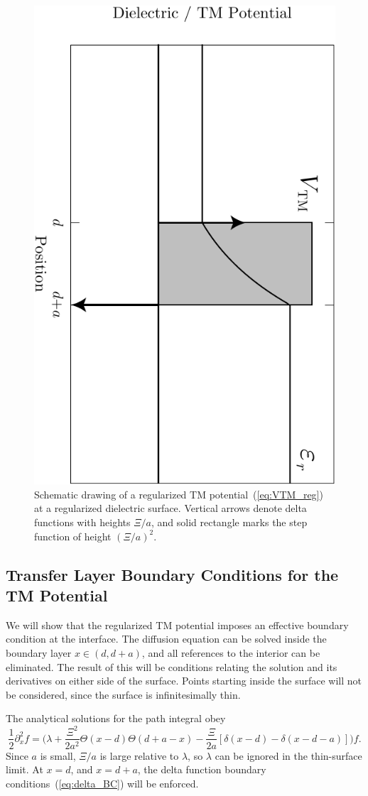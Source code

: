 \begin{figure}
  \centering
  \includegraphics[width=0.4\linewidth,angle=90]{fig/analytical/TMpot}
  \caption[Regularized TM potential]{Schematic drawing of a regularized TM potential~(\ref{eq:VTM_reg})
    at a regularized dielectric surface.  
    Vertical arrows denote delta functions with heights $\Xi/a$, and solid rectangle marks the 
    step function of height $(\Xi/a)^2$.  }
  \label{fig:TMpot}
\end{figure}


\subsection[Transfer Layer Boundary Conditions for the \\ TM Potential]
{Transfer Layer Boundary Conditions for the TM Potential}

We will show that the regularized TM potential imposes an effective boundary condition at the interface. 
The diffusion equation can be solved inside the boundary layer $x\in(d,d+a)$, and all references 
to the interior can be eliminated.  The result of this will be conditions relating
the solution and its derivatives on either side of the surface.
Points starting inside the surface will not be considered, since the surface is infinitesimally thin.

The analytical solutions for the path integral obey
\begin{equation}
  \frac{1}{2}\partial_x^2f =\bigg(\lambda+\frac{\Xi^2}{2a^2}\Theta(x-d)\Theta(d+a-x)
  - \frac{\Xi}{2a}[\delta(x-d)-\delta(x-d-a)]\bigg)f.
\end{equation}
Since $a$ is small, $\Xi/a$ is large relative to $\lambda$, so $\lambda$ can be ignored in the thin-surface limit.    
At $x=d$, and $x=d+a$, the delta function boundary conditions~(\ref{eq:delta_BC}) will be enforced.

